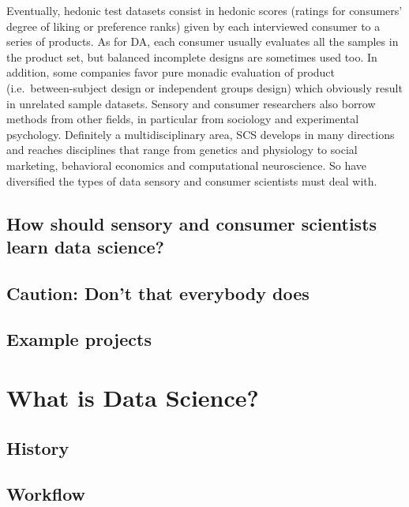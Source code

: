 \documentclass[
]{book}
\begin{document}
Eventually, hedonic test datasets consist in hedonic scores (ratings for consumers' degree of liking or preference ranks) given by each interviewed consumer to a series of products. As for DA, each consumer usually evaluates all the samples in the product set, but balanced incomplete designs are sometimes used too. In addition, some companies favor pure monadic evaluation of product (i.e.~between-subject design or independent groups design) which obviously result in unrelated sample datasets.
Sensory and consumer researchers also borrow methods from other fields, in particular from sociology and experimental psychology. Definitely a multidisciplinary area, SCS develops in many directions and reaches disciplines that range from genetics and physiology to social marketing, behavioral economics and computational neuroscience. So have diversified the types of data sensory and consumer scientists must deal with.

\hypertarget{how-should-sensory-and-consumer-scientists-learn-data-science}{%
\section{How should sensory and consumer scientists learn data science?}\label{how-should-sensory-and-consumer-scientists-learn-data-science}}

\hypertarget{caution-dont-that-everybody-does}{%
\section{Caution: Don't that everybody does}\label{caution-dont-that-everybody-does}}

\hypertarget{example-projects}{%
\section{Example projects}\label{example-projects}}

\hypertarget{data_science}{%
\chapter{What is Data Science?}\label{data_science}}

\hypertarget{history}{%
\section{History}\label{history}}

\hypertarget{workflow}{%
\section{Workflow}\label{workflow}}
\end{document}
